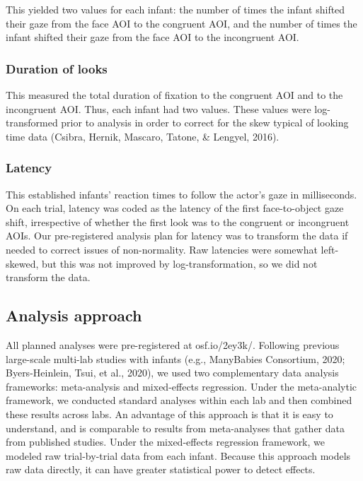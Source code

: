 \documentclass[
  english,
  ,man,floatsintext]{apa6}
\begin{document}
This yielded two values for each infant: the number of times the infant shifted their gaze from the face AOI to the congruent AOI, and the number of times the infant shifted their gaze from the face AOI to the incongruent AOI.

\hypertarget{duration-of-looks}{%
\subsubsection{Duration of looks}\label{duration-of-looks}}

This measured the total duration of fixation to the congruent AOI and to the incongruent AOI. Thus, each infant had two values. These values were log-transformed prior to analysis in order to correct for the skew typical of looking time data (Csibra, Hernik, Mascaro, Tatone, \& Lengyel, 2016).

\hypertarget{latency}{%
\subsubsection{Latency}\label{latency}}

This established infants' reaction times to follow the actor's gaze in milliseconds. On each trial, latency was coded as the latency of the first face-to-object gaze shift, irrespective of whether the first look was to the congruent or incongruent AOIs. Our pre-registered analysis plan for latency was to transform the data if needed to correct issues of non-normality. Raw latencies were somewhat left-skewed, but this was not improved by log-transformation, so we did not transform the data.

\hypertarget{analysis-approach}{%
\subsection{Analysis approach}\label{analysis-approach}}

All planned analyses were pre-registered at osf.io/2ey3k/. Following previous large-scale multi-lab studies with infants (e.g., ManyBabies Consortium, 2020; Byers-Heinlein, Tsui, et al., 2020), we used two complementary data analysis frameworks: meta-analysis and mixed-effects regression. Under the meta-analytic framework, we conducted standard analyses within each lab and then combined these results across labs. An advantage of this approach is that it is easy to understand, and is comparable to results from meta-analyses that gather data from published studies. Under the mixed-effects regression framework, we modeled raw trial-by-trial data from each infant. Because this approach models raw data directly, it can have greater statistical power to detect effects.
\end{document}
